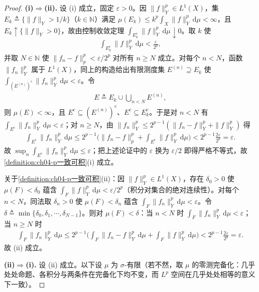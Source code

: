 \documentclass[../../main.tex]{subfiles}%
\begin{document}
\begin{proof}
\textbf{(i)$\Rightarrow$(ii).} 设 (i) 成立，固定 $\varepsilon>0$。因 $\|f\|_Y^p\in L^1(X)$，集 $E_k\triangleq\{\|f\|_Y>1/k\}$（$k\in\mathbb{N}$）满足 $\mu(E_k)\leqslant k^p\int_X\|f\|_Y^p\,\mathrm{d}\mu<\infty$，且 $E_k\uparrow\{\|f\|_Y>0\}$，故由控制收敛定理 $\int_{E_k^c}\|f\|_Y^p\,\mathrm{d}\mu\downarrow0$。取 $k$ 使
\begin{align*}
\int_{E_k^c}\|f\|_Y^p\,\mathrm{d}\mu<\frac{\varepsilon}{2^p},
\end{align*}
并取 $N\in\mathbb{N}$ 使 $\|f_n-f\|_p^p<\varepsilon/2^p$ 对所有 $n\geqslant N$ 成立。对每个 $n<N$，函数 $\|f_n\|_Y^p$ 属于 $L^1(X)$，同上的构造给出有限测度集 $E^{(n)}\supseteq E_k$ 使 $\int_{(E^{(n)})^c}\|f_n\|_Y^p\,\mathrm{d}\mu<\varepsilon$。令
\begin{align*}
E\triangleq E_k\cup\bigcup_{n<N}E^{(n)},
\end{align*}
则 $\mu(E)<\infty$，且 $E^c\subseteq(E^{(n)})^c$、$E^c\subseteq E_k^c$。于是对 $n<N$ 有 $\int_{E^c}\|f_n\|_Y^p\,\mathrm{d}\mu<\varepsilon$；对 $n\geqslant N$，由 $\|f_n\|_Y^p\leqslant2^{p-1}(\|f_n-f\|_Y^p+\|f\|_Y^p)$ 得
\begin{align*}
\int_{E^c}\|f_n\|_Y^p\,\mathrm{d}\mu\leqslant2^{p-1}\Big(\|f_n-f\|_p^p+\int_{E^c}\|f\|_Y^p\,\mathrm{d}\mu\Big)<2^{p-1}\frac{2\varepsilon}{2^p}=\varepsilon .
\end{align*}
故 $\sup_n\int_{E^c}\|f_n\|_Y^p\,\mathrm{d}\mu\leqslant\varepsilon$；把上述论证中的 $\varepsilon$ 换为 $\varepsilon/2$ 即得严格不等式，故\cref{definition:ch04-p一致可积}(i) 成立。

关于\cref{definition:ch04-p一致可积}(ii)：因 $\|f\|_Y^p\in L^1(X)$，存在 $\delta_0>0$ 使 $\mu(F)<\delta_0$ 蕴含 $\int_F\|f\|_Y^p\,\mathrm{d}\mu<\varepsilon/2^p$（积分对集合的绝对连续性）。对每个 $n<N$，同法取 $\delta_n>0$ 使 $\mu(F)<\delta_n$ 蕴含 $\int_F\|f_n\|_Y^p\,\mathrm{d}\mu<\varepsilon$。令 $\delta\triangleq\min\{\delta_0,\delta_1,\cdots ,\delta_{N-1}\}$。则对 $\mu(F)<\delta$：当 $n<N$ 时 $\int_F\|f_n\|_Y^p\,\mathrm{d}\mu<\varepsilon$；当 $n\geqslant N$ 时
\begin{align*}
\int_F\|f_n\|_Y^p\,\mathrm{d}\mu\leqslant2^{p-1}\Big(\int_F\|f_n-f\|_Y^p\,\mathrm{d}\mu+\int_F\|f\|_Y^p\,\mathrm{d}\mu\Big)<2^{p-1}\frac{2\varepsilon}{2^p}=\varepsilon .
\end{align*}
故 (ii) 成立。

\textbf{(ii)$\Rightarrow$(i).} 设 (ii) 成立。以下设 $\mu$ 为 $\sigma$-有限（若不然，取 $\mu$ 的零测完备化：几乎处处命题、各积分与两条件在完备化下均不变，而 $L^p$ 空间在几乎处处相等的意义下一致）。


\end{proof}
\end{document}
